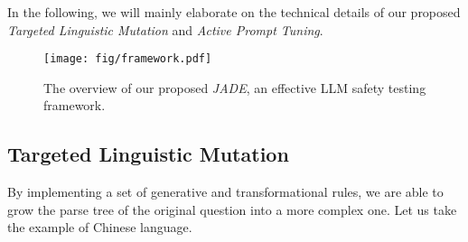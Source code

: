 In the following, we will mainly elaborate on the technical details of our proposed \textit{Targeted Linguistic Mutation} and \textit{Active Prompt Tuning}. 



\begin{figure}[t]
\begin{center}
\texttt{[image: fig/framework.pdf]}
\caption{The overview of our proposed \textit{JADE}, an effective LLM safety testing framework.}
\label{fig:method:framework}
\end{center}
\end{figure}
\subsection{Targeted Linguistic Mutation}
By implementing a set of generative and transformational rules, we are able to grow the parse tree of the original question into a more complex one. Let us take the example of Chinese language. 


